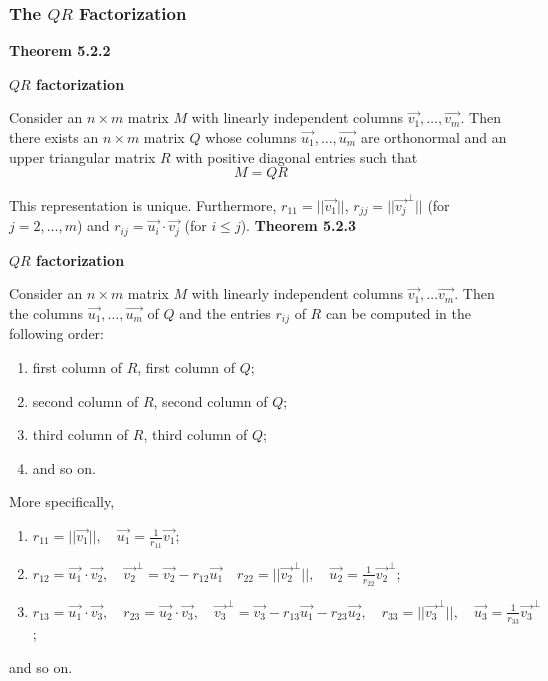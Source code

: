 \subsubsection*{The $QR$ Factorization}
\textbf{Theorem 5.2.2}\\
\par\noindent\textbf{$QR$ factorization}
\par\noindent Consider an $n\times{}m$ matrix $M$ with linearly independent columns $\vec{v_{1}},\ldots{},\vec{v_{m}}$. Then there exists an $n\times{}m$ matrix $Q$ whose columns $\vec{u_{1}},\ldots{},\vec{u_{m}}$ are orthonormal and an upper triangular matrix $R$ with positive diagonal entries such that
\[M=QR\]
\par\noindent This representation is unique. Furthermore, $r_{11}=||\vec{v_{1}}||$, $r_{jj}=||\vec{v_{j}}^{\perp}||$ (for $j=2,\ldots{},m$) and $r_{ij}=\vec{u_{i}}\cdot{}\vec{v_{j}}$ (for $i\le{}j$).
\textbf{Theorem 5.2.3}\\
\par\noindent\textbf{$QR$ factorization}
\par\noindent Consider an $n\times{}m$ matrix $M$ with linearly independent columns $\vec{v_{1}},\ldots{}\vec{v_{m}}$. Then the columns $\vec{u_{1}},\ldots{},\vec{u_{m}}$ of $Q$ and the entries $r_{ij}$ of $R$ can be computed in the following order:
\renewcommand{\labelenumi}{$\quad$}
\begin{enumerate}
\item first column of $R$, first column of $Q$;
\item second column of $R$, second column of $Q$;
\item third column of $R$, third column of $Q$;
\item and so on.
\end{enumerate}
\par\noindent More specifically,
\renewcommand{\labelenumi}{$\quad$}
\begin{enumerate}
\item $\displaystyle r_{11}=||\vec{v_{1}}||,\quad{}\vec{u_{1}}=\frac{1}{r_{11}}\vec{v_{1}}$;
\item $\displaystyle r_{12}=\vec{u_{1}}\cdot{}\vec{v_{2}},\quad{}\vec{v_{2}}^{\perp}=\vec{v_{2}}-r_{12}\vec{u_{1}}\quad{}r_{22}=||\vec{v_{2}}^{\perp}||,\quad{}\vec{u_{2}}=\frac{1}{r_{22}}\vec{v_{2}}^{\perp}$;
\item $\displaystyle r_{13}=\vec{u_{1}}\cdot{}\vec{v_{3}},\quad{}r_{23}=\vec{u_{2}}\cdot{}\vec{v_{3}},\quad{}\vec{v_{3}}^{\perp}=\vec{v_{3}}-r_{13}\vec{u_{1}}-r_{23}\vec{u_{2}},\quad{}r_{33}=||\vec{v_{3}}^{\perp}||,\quad{}\vec{u_{3}}=\frac{1}{r_{33}}\vec{v_{3}}^{\perp}$;
\end{enumerate}
\par\noindent and so on.


